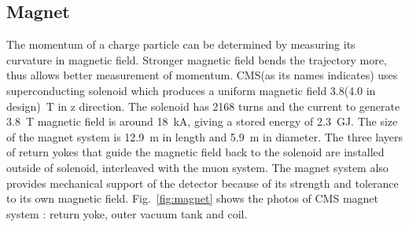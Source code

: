 %




\subsection{Magnet} 

The momentum of a charge particle can be determined by measuring 
its curvature in magnetic field. Stronger magnetic field bends   
the trajectory more, thus allows better measurement of momentum.
CMS(as its names indicates) uses superconducting solenoid 
which produces a uniform magnetic field  3.8(4.0 in design)~T 
in z direction. %
The solenoid has 2168 turns and the current to generate 3.8~T magnetic field  
is around 18~kA, giving a stored energy of 2.3~GJ. 
The size of the magnet system is 12.9~m in length and 5.9~m in diameter. 
The three layers of return yokes that guide the magnetic field back to the solenoid 
are installed outside of solenoid, interleaved with the muon system. 
The magnet system also provides mechanical support of the detector
because of its strength and tolerance to its own magnetic field. 
Fig.~\ref{fig:magnet} shows the photos of CMS magnet system : 
return yoke, outer vacuum tank and coil. 


